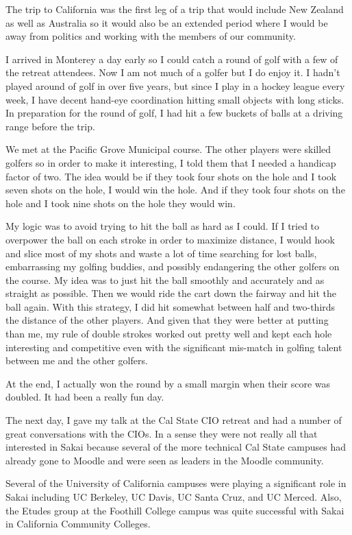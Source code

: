 \documentclass[12pt]{book}
\begin{document}
The trip to California was the first leg of a trip that
would include New Zealand as well as Australia so it would
also be an extended period where I would be away from
politics and working with the members of our community.

I arrived in Monterey a day early so I could catch a round of
golf with a few of the retreat attendees.  Now I am not much of
a golfer but I do enjoy it.  I hadn't played
around of golf in over five years, but since I play
in a hockey league every week, I have decent hand-eye
coordination hitting small objects with long sticks.
In preparation for the round of golf, I had hit a few
buckets of balls at a driving range before the trip.

We met at the Pacific Grove Municipal course.
The other players were skilled golfers so in order to make
it interesting, I told them that I needed a handicap factor
of two.  The idea would be if they took four shots on the
hole and I took seven shots on the hole, I would win the
hole.  And if they took four shots on the hole and I
took nine shots on the hole they would win.

My logic was to avoid trying to hit the ball as hard
as I could.  If I tried to overpower the ball on each
stroke in order to maximize distance, I would hook and slice
most of my shots and waste a lot of time searching
for lost balls, embarrassing my golfing buddies, and
possibly endangering the other golfers on the course.
My idea was to just hit the ball smoothly and
accurately and as straight as possible.  Then we would ride
the cart down the fairway and hit the ball again.
With this strategy, I did hit somewhat between half
and two-thirds the distance of the other players.
And given that they were better at putting than me,
my rule of double strokes worked out pretty well
and kept each hole interesting and competitive
even with the significant mis-match in golfing
talent between me and the other golfers.

At the end, I actually won the round by a small
margin when their score was doubled. It had been
a really fun day.

The next day, I gave my talk at the Cal State
CIO retreat and had a number of great conversations
with the CIOs.   In a sense they were not really
all that interested in Sakai because several of
the more technical Cal State campuses had already
gone to Moodle and were seen as leaders in the
Moodle community.

Several of the University of California campuses were
playing a significant role in
Sakai including UC Berkeley, UC Davis, UC Santa Cruz, and UC Merced.
Also, the Etudes group at the
Foothill College campus was quite successful
with Sakai in California Community Colleges.
\end{document}
